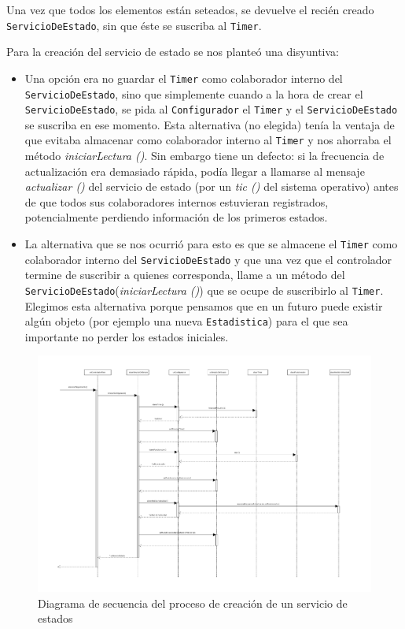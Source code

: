  Una vez que todos los elementos están seteados, se devuelve el recién creado \texttt{ServicioDeEstado}, sin que éste se suscriba al \texttt{Timer}.  


Para la creación del servicio de estado se nos planteó una disyuntiva:
\begin{itemize}
	\item Una opción era no guardar el \texttt{Timer} como colaborador interno del \texttt{ServicioDeEstado}, sino que simplemente cuando a la hora de crear el \texttt{ServicioDeEstado}, se pida al \texttt{Configurador} el \texttt{Timer} y el \texttt{ServicioDeEstado} se suscriba en ese momento. Esta alternativa (no elegida) tenía la ventaja de que evitaba almacenar como colaborador interno al \texttt{Timer} y nos ahorraba el método \emph{iniciarLectura ()}. Sin embargo tiene un defecto: si la frecuencia de actualización era demasiado rápida, podía llegar a llamarse al mensaje \emph{actualizar ()} del servicio de estado (por un \emph{tic ()} del sistema operativo) antes de que todos sus colaboradores internos estuvieran registrados, potencialmente perdiendo información de los primeros estados.
	\item La alternativa que se nos ocurrió para esto es que se almacene el \texttt{Timer} como colaborador interno del \texttt{ServicioDeEstado} y que una vez que el controlador termine de suscribir a quienes corresponda, llame a un método del \texttt{ServicioDeEstado}(\emph{iniciarLectura ()}) que se ocupe de suscribirlo al \texttt{Timer}. Elegimos esta alternativa porque pensamos que en un futuro puede existir algún objeto (por ejemplo una nueva \texttt{Estadistica}) para el que sea importante no perder los estados iniciales. 
\end{itemize}


\newpage

\begin{landscape}
	\begin{figure}[h]
		\includegraphics[scale=0.8]{images/CrearServicioEstado.pdf}
		\caption{Diagrama de secuencia del proceso de creación de un servicio de estados}
	\end{figure} 
\end{landscape}

